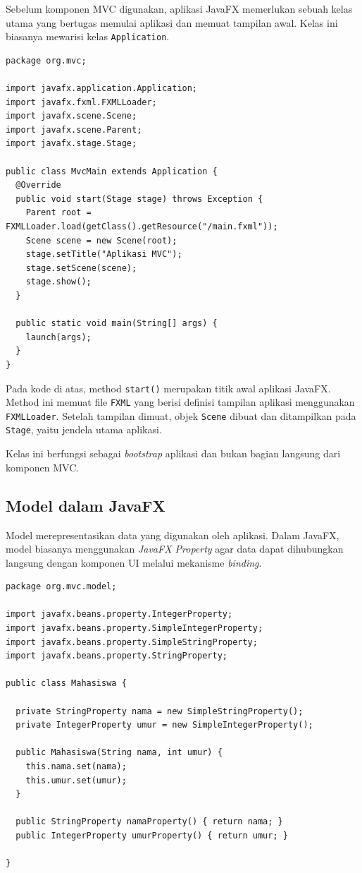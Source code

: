 Sebelum komponen MVC digunakan, aplikasi JavaFX memerlukan sebuah kelas utama yang bertugas memulai aplikasi dan memuat tampilan awal. Kelas ini biasanya mewarisi kelas \texttt{Application}.

\begin{lstlisting}[style=JavaStyle, caption=Kelas utama untuk memulai aplikasi JavaFX]
package org.mvc;

import javafx.application.Application;
import javafx.fxml.FXMLLoader;
import javafx.scene.Scene;
import javafx.scene.Parent;
import javafx.stage.Stage;

public class MvcMain extends Application {
  @Override
  public void start(Stage stage) throws Exception {
    Parent root = FXMLLoader.load(getClass().getResource("/main.fxml"));
    Scene scene = new Scene(root);
    stage.setTitle("Aplikasi MVC");
    stage.setScene(scene);
    stage.show();
  }

  public static void main(String[] args) {
    launch(args);
  }
}
\end{lstlisting}

Pada kode di atas, method \texttt{start()} merupakan titik awal aplikasi JavaFX. Method ini memuat file \texttt{FXML} yang berisi definisi tampilan aplikasi menggunakan \texttt{FXMLLoader}. Setelah tampilan dimuat, objek \texttt{Scene} dibuat dan ditampilkan pada \texttt{Stage}, yaitu jendela utama aplikasi.

Kelas ini berfungsi sebagai \textit{bootstrap} aplikasi dan bukan bagian langsung dari komponen MVC.

\subsection{Model dalam JavaFX}

Model merepresentasikan data yang digunakan oleh aplikasi. Dalam JavaFX, model biasanya menggunakan \textit{JavaFX Property} agar data dapat dihubungkan langsung dengan komponen UI melalui mekanisme \textit{binding}.

\begin{lstlisting}[style=JavaStyle, caption=Model dalam aplikasi JavaFX]
package org.mvc.model;

import javafx.beans.property.IntegerProperty;
import javafx.beans.property.SimpleIntegerProperty;
import javafx.beans.property.SimpleStringProperty;
import javafx.beans.property.StringProperty;

public class Mahasiswa {

  private StringProperty nama = new SimpleStringProperty();
  private IntegerProperty umur = new SimpleIntegerProperty();

  public Mahasiswa(String nama, int umur) {
    this.nama.set(nama);
    this.umur.set(umur);
  }

  public StringProperty namaProperty() { return nama; }
  public IntegerProperty umurProperty() { return umur; }

}
\end{lstlisting}

